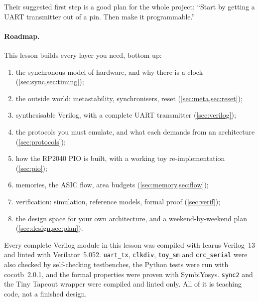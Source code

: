 Their suggested first step is a good plan for the whole project: ``Start by
getting a UART transmitter out of a pin. Then make it programmable.''

\begin{center}
\end{center}

\paragraph{Roadmap.} This lesson builds every layer you need, bottom up:
\begin{enumerate}[label=\arabic*.]
  \item the synchronous model of hardware, and why there is a clock
    (\cref{sec:sync,sec:timing});
  \item the outside world: metastability, synchronisers, reset
    (\cref{sec:meta,sec:reset});
  \item synthesisable Verilog, with a complete UART transmitter
    (\cref{sec:verilog});
  \item the protocols you must emulate, and what each demands from an
    architecture (\cref{sec:protocols});
  \item how the RP2040 PIO is built, with a working toy re-implementation
    (\cref{sec:pio});
  \item memories, the ASIC flow, area budgets (\cref{sec:memory,sec:flow});
  \item verification: simulation, reference models, formal proof
    (\cref{sec:verif});
  \item the design space for your own architecture, and a weekend-by-weekend
    plan (\cref{sec:design,sec:plan}).
\end{enumerate}
Every complete Verilog module in this lesson was compiled with Icarus
Verilog~13 and linted with Verilator~5.052. \texttt{uart\_tx},
\texttt{clkdiv}, \texttt{toy\_sm} and \texttt{crc\_serial} were also checked
by self-checking testbenches, the Python tests were run with cocotb~2.0.1, and
the formal properties were proven with SymbiYosys. \texttt{sync2} and the
Tiny Tapeout wrapper were compiled and linted only. All of it is teaching
code, not a finished design.

